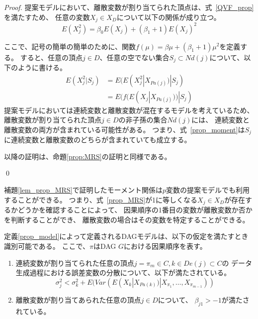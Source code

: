 \begin{proof}
  提案モデルにおいて、離散変数が割り当てられた頂点は、式~\eqref{QVF_prop}を満たすため、
  任意の変数$X_j \in X_D$について以下の関係が成り立つ。
  \begin{equation*}
    E(X_j^2) = \beta_0 E(X_j) + (\beta_1 + 1)E(X_j)^2
  \end{equation*}

  ここで、記号の簡単の簡単のために、関数$f(\mu) = \beta \mu + (\beta_1 + 1) \mu^2$を定義する。
  すると、任意の頂点$j \in D$、任意の空でない集合$S_j \subset Nd(j)$について、以下のように書ける。
  \begin{equation}
    \begin{split}
      E(X_j^2 | S_j) &= E(E(X_j^2 | X_{Pa(j)}) | S_j) \\
                     &= E(f(E(X_j | X_{Pa(j)})) | S_j)
    \end{split}
    \label{prop_moment}
  \end{equation}
  提案モデルにおいては連続変数と離散変数が混在するモデルを考えているため、
  離散変数が割り当てられた頂点$j \in D$の非子孫の集合$Nd(j)$には、
  連続変数と離散変数の両方が含まれている可能性がある。
  つまり、式~\eqref{prop_moment}は$S_j$に連続変数と離散変数のどちらが含まれていても成立する。

  以降の証明は、命題\ref{prop:MRS}の証明と同様である。

  \qed
\end{proof}

補題\ref{lem_prop_MRS}で証明したモーメント関係は$p$変数の提案モデルでも利用することができる。
つまり、式~\eqref{prop_MRS}が1に等しくなる$X_j \in X_D$が存在するかどうかを確認することによって、
因果順序の1番目の変数が離散変数か否かを判断することができ、
離散変数の場合はその変数を特定することができる。

\begin{theo}[提案モデルの識別可能性]
  \label{theo:prop_identifiability}
  定義\ref{prop_model}によって定義されるDAGモデルは、以下の仮定を満たすとき識別可能である。
  ここで、$\pi$はDAG $G$における因果順序を表す。
  \begin{enumerate}[label=(\Alph*)]
    \item
    連続変数が割り当てられた任意の頂点$j = \pi_m \in C, k \in De(j) \subset C$の
    データ生成過程における誤差変数の分散について、以下が満たされている。
    \begin{equation*}
      \sigma_j^2 < \sigma_k^2 + E(\mathit{Var}(E(X_k | X_{Pa(k)}) | X_{\pi_1}, \dots, X_{\pi_{m-1}}))
    \end{equation*}

    \item
    離散変数が割り当てあられた任意の頂点$j \in D$について、
    $\beta_{j1} > -1$が満たされている。
  \end{enumerate}
\end{theo}

